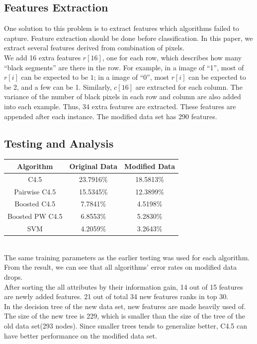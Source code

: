 \documentclass[a4paper,11pt]{nurop}
\begin{document}
\subsection{Features Extraction}
One solution to this problem is to extract features which algorithms failed to capture. Feature extraction should be done before classification. In this paper, we extract several features derived from combination of pixels.\\
We add 16 extra features $r[16]$, one for each row, which describes how many ``black segments'' are there in the row. For example, in a image of ``1'', most of $r[i]$ can be expected to be $1$; in a image of ``0'', most $r[i]$ can be expected to be 2, and a few can be 1. Similarly, $c[16]$ are extracted for each column. The variance of the number of black pixels in each row and column are also added into each example. Thus, 34 extra features are extracted. These features are appended after each instance. The modified data set has 290 features.\\
\subsection{Testing and Analysis}
\vspace{0.5cm}
\begin{tabular}{c c c}
Algorithm		&	Original Data	&Modified Data\\
\hline \hline
C4.5                            &23.7916\%		& 18.5813\%\\
Pairwise C4.5                   &15.5345\%      & 12.3899\%\\
Boosted C4.5	                &7.7841\%		& 4.5198\%\\
Boosted PW C4.5	                &6.8553\%       & 5.2830\%\\
SVM                         	&4.2059\%       & 3.2643\%\\
\end{tabular}
\vspace{0.5cm}\\
The same training parameters as the earlier testing was used for each algorithm. From the result, we can see that all algorithms' error rates on modified data drops.\\
After sorting the all attributes by their information gain, 14 out of 15 features are newly added features. 21 out of total 34 new features ranks in top 30.\\
In the decision tree of the new data set, new features are made heavily used of. The size of the new tree is 229, which is smaller than the size of the tree of the old data set(293 nodes). Since smaller trees tends to generalize better, C4.5 can have better performance on the modified data set.\\
\end{document}
